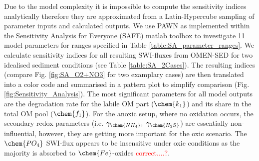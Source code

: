 \documentclass[gmd, manuscript]{copernicus}
\begin{document}
Due to the model complexity it is impossible to compute the sensitivity indices analytically therefore they are approximated from a Latin-Hypercube sampling of parameter inputs and calculated outputs.
We use PAWN as implemented within the Sensitivity Analysis for Everyone (SAFE) matlab toolbox \citep{pianosi_matlab_2015} to investigate 11 model parameters for ranges specified in Table \ref{table:SA_parameter_ranges}. 
We calculate sensitivity indices for all resulting SWI-fluxes from OMEN-SED for two idealised sediment conditions (see Table \ref{table:SA_2Cases}). 
The resulting indices (compare Fig. \ref{fig:SA_O2+NO3} for two examplary cases) are then translated into a color code and summarised in a pattern plot to simplify comparison (Fig. \ref{fig:Sensitivity_Analysis}). 
The most significant parameters for all model outputs are the degradation rate for the labile OM part ($\chem{k_1}$) and its share in the total OM pool ($\chem{f_1}$).
For the anoxic setup, where no oxidation occurs, the secondary redox parameters (i.e. $\gamma_\chem{NH_4},\ \gamma_\chem{H_2S}$) are essentially non-influential, however, they are getting more important for the oxic scenario. 
The $\chem{PO_4}$ SWI-flux appears to be insensitive under oxic conditions as the majority is absorbed to $\chem{Fe}$-oxides \textcolor{red}{correct....?}.
\end{document}

